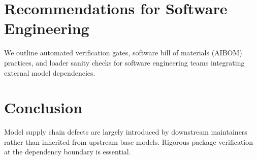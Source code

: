 \documentclass[conference]{IEEEtran}
\begin{document}
\section{Recommendations for Software Engineering}
We outline automated verification gates, software bill of materials (AIBOM) practices, and loader sanity checks for software engineering teams integrating external model dependencies.

\section{Conclusion}
Model supply chain defects are largely introduced by downstream maintainers rather than inherited from upstream base models. Rigorous package verification at the dependency boundary is essential.



\end{document}
